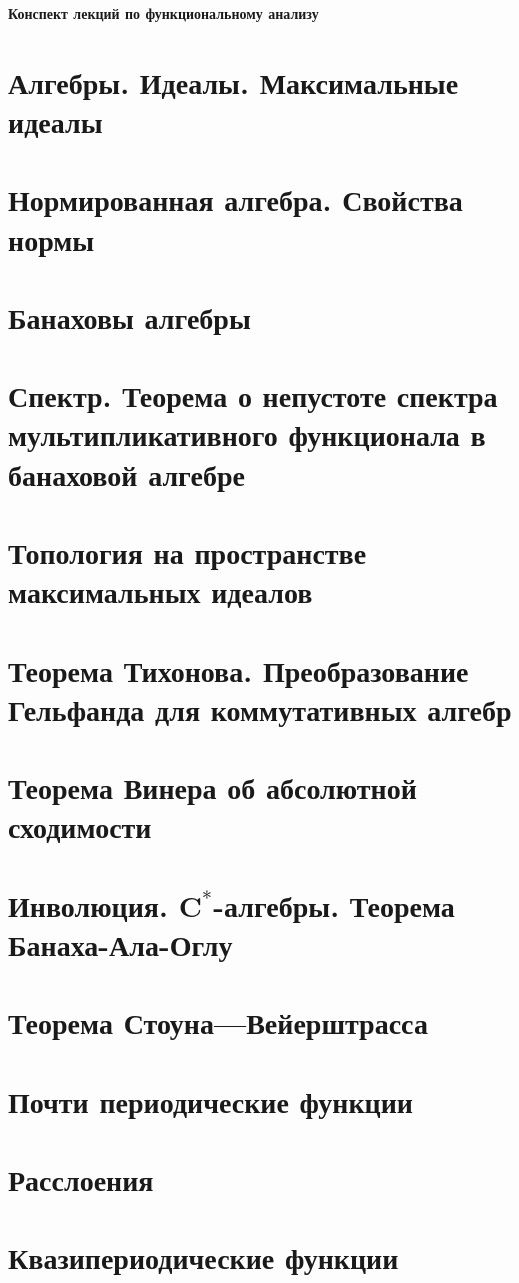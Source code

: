 \documentclass[a4paper,12pt]{extarticle}
\theoremstyle{definition}
\begin{document}
    \begin{titlepage}
        \null
        \vfill
        \centering\Huge\bfseries Конспект лекций по функциональному анализу
        \vfill
        \null
    \end{titlepage}
    \tableofcontents
    \section{Алгебры. Идеалы. Максимальные идеалы}

    \section{Нормированная алгебра. Свойства нормы}

    \section{Банаховы алгебры}

    \section{Спектр. Теорема о непустоте спектра мультипликативного функционала в банаховой алгебре}

    \section{Топология на пространстве максимальных идеалов}

    \section{Теорема Тихонова. Преобразование Гельфанда для коммутативных алгебр}

    \section{Теорема Винера об абсолютной сходимости}

    \section{Инволюция. $\mathbf{C^*}$-алгебры. Теорема Банаха-Ала-Оглу}

    \section{Теорема Стоуна---Вейерштрасса}

    \section{Почти периодические функции}

    \section{Расслоения}

    \section{Квазипериодические функции}
\end{document}
